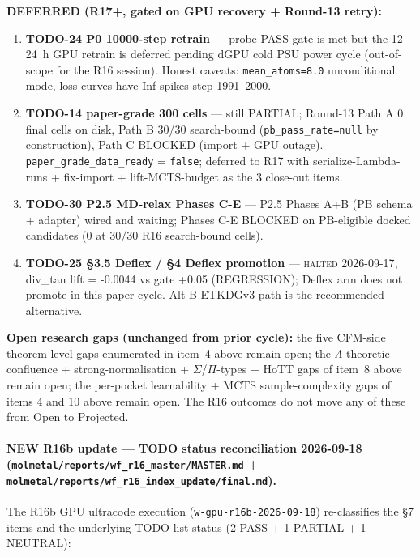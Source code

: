 \textbf{DEFERRED (R17+, gated on GPU recovery + Round-13 retry):}
\begin{enumerate}
  \item \textbf{TODO-24 P0 10000-step retrain} --- probe PASS gate is
        met but the 12--24~h GPU retrain is deferred pending dGPU
        cold PSU power cycle (out-of-scope for the R16 session).
        Honest caveats: \texttt{mean\_atoms=8.0} unconditional mode,
        loss curves have Inf spikes step 1991--2000.
  \item \textbf{TODO-14 paper-grade 300 cells} --- still PARTIAL;
        Round-13 Path A 0 final cells on disk, Path B 30/30
        search-bound (\texttt{pb\_pass\_rate=null} by construction),
        Path C BLOCKED (import + GPU outage).
        \texttt{paper\_grade\_data\_ready} = \texttt{false}; deferred
        to R17 with serialize-Lambda-runs + fix-import + lift-MCTS-budget
        as the 3 close-out items.
  \item \textbf{TODO-30 P2.5 MD-relax Phases C-E} --- P2.5 Phases A+B
        (PB schema + adapter) wired and waiting; Phases C-E BLOCKED
        on PB-eligible docked candidates (0 at 30/30 R16 search-bound
        cells).
  \item \textbf{TODO-25 §3.5 Deflex / §4 Deflex promotion} ---
        \textsc{halted 2026-09-17}, div\_tan lift = -0.0044 vs gate
        +0.05 (REGRESSION); Deflex arm does not promote in this
        paper cycle. Alt B ETKDGv3 path is the recommended
        alternative.
\end{enumerate}

\textbf{Open research gaps (unchanged from prior cycle):}
the five CFM-side theorem-level gaps enumerated in item~4
above remain open; the $\Lambda$-theoretic confluence +
strong-normalisation + $\Sigma$/$\Pi$-types + HoTT gaps of
item~8 above remain open; the per-pocket learnability + MCTS
sample-complexity gaps of items 4 and 10 above remain open.
The R16 outcomes do not move any of these from Open to
Projected.

\paragraph{NEW R16b update --- TODO status reconciliation 2026-09-18
(\texttt{molmetal/reports/wf\_r16\_master/MASTER.md} +
\texttt{molmetal/reports/wf\_r16\_index\_update/final.md}).}
The R16b GPU ultracode execution (\texttt{w-gpu-r16b-2026-09-18})
re-classifies the §7 items and the underlying TODO-list status
(2 PASS + 1 PARTIAL + 1 NEUTRAL):

